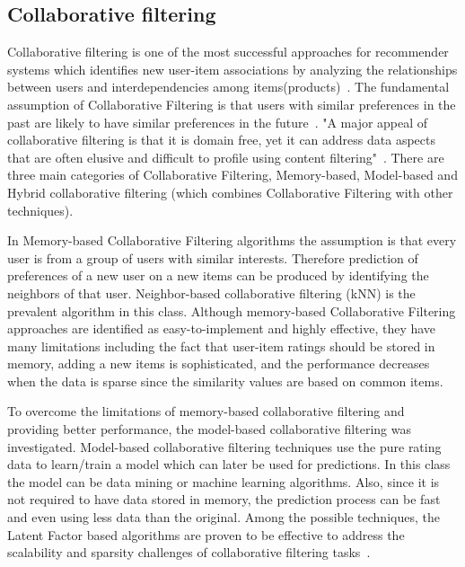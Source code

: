 \subsection{Collaborative filtering}
Collaborative filtering is one of the most successful approaches for recommender systems which identifies new user-item associations by analyzing the relationships between users and interdependencies among items(products)~\cite{koren2009matrix}. The fundamental assumption of Collaborative Filtering is that users with similar preferences in the past are likely to have similar preferences in the future~\cite{su2009survey}. "A major appeal of collaborative filtering is that it is domain free, yet it can address data aspects that are often elusive and difficult to profile using content filtering"~\cite{koren2009matrix}. There are three main categories of Collaborative Filtering, Memory-based, Model-based and Hybrid collaborative filtering (which combines Collaborative Filtering with other techniques). 

In Memory-based Collaborative Filtering algorithms the assumption is that every user is from a group of users with similar interests. Therefore prediction of preferences of a new user on a new items can be produced by identifying the neighbors of that user.
Neighbor-based collaborative filtering (kNN) is the prevalent algorithm in this class. 
Although memory-based Collaborative Filtering approaches are identified as easy-to-implement and highly eﬀective, they have many limitations including the fact that user-item ratings should be stored in memory, adding a new items is sophisticated, and the performance decreases when the data is sparse since the similarity values are based on common items.


To overcome the limitations of memory-based collaborative filtering and providing better performance, the model-based collaborative filtering was investigated. Model-based collaborative filtering techniques use the pure rating data to learn/train a model which can later be used for predictions. In this class the model can be data mining or machine learning algorithms. Also, since it is not required to have data stored in memory, the prediction process can be fast and even using less data than the original. Among the possible techniques, the Latent Factor based algorithms are proven to be eﬀective to address the scalability and sparsity challenges of collaborative filtering tasks~\cite{su2009survey,la2021evaluating}.



